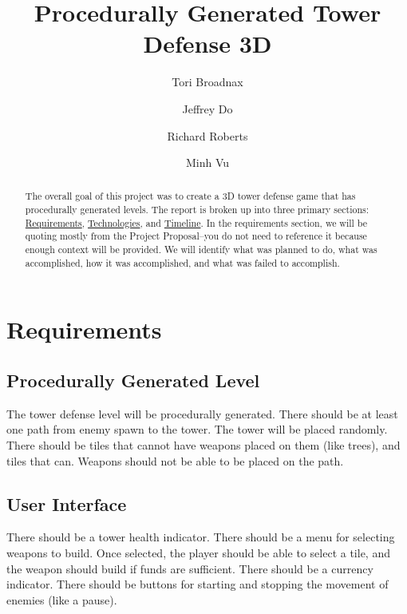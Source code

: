 \documentclass{article}
\title{Procedurally Generated Tower Defense 3D}
\author[1]{Tori Broadnax}
\author[1]{Jeffrey Do}
\author[1]{Richard Roberts}
\author[1]{Minh Vu}
\affil[1]{George Mason University}
\begin{document}
\maketitle

\begin{abstract}
    The overall goal of this project was to create a 3D tower defense game that has procedurally generated levels. The report is broken up into three primary sections: \hyperref[sec:Requirements]{Requirements}, \hyperref[sec:Technologies]{Technologies}, and \hyperref[sec:Timeline]{Timeline}. In the requirements section, we will be quoting mostly from the Project Proposal--you do not need to reference it because enough context will be provided. We will identify what was planned to do, what was accomplished, how it was accomplished, and what was failed to accomplish. 
\end{abstract}

\newpage

\tableofcontents

\newpage

\section{Requirements}
\label{sec:Requirements}

\subsection{Procedurally Generated Level}

\begin{displayquote}
    \small
    The tower defense level will be procedurally generated. There should be at least one path from enemy spawn to the tower. The tower will be placed randomly. There should be tiles that cannot have weapons placed on them (like trees), and tiles that can. Weapons should not be able to be placed on the path.
\end{displayquote}

\subsection{User Interface}

There should be a tower health indicator. There should be a menu for selecting weapons to build. Once selected, the player should be able to select a tile, and the weapon should build if funds are sufficient. There should be a currency indicator. There should be buttons for starting and stopping the movement of enemies (like a pause).
\end{document}
